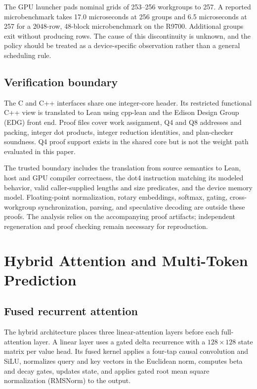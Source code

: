 \documentclass[10pt]{article}
\begin{document}
The GPU launcher pads nominal grids of 253--256 workgroups to 257. A reported microbenchmark takes 17.0 microseconds at 256 groups and 6.5 microseconds at 257 for a 2048-row, 48-block microbenchmark on the R9700. Additional groups exit without producing rows. The cause of this discontinuity is unknown, and the policy should be treated as a device-specific observation rather than a general scheduling rule.

\subsection{Verification boundary}
The C and C++ interfaces share one integer-core header. Its restricted functional C++ view is translated to Lean using cpp-lean and the Edison Design Group (EDG) front end. Proof files cover work assignment, Q4 and Q8 addresses and packing, integer dot products, integer reduction identities, and plan-checker soundness. Q4 proof support exists in the shared core but is not the weight path evaluated in this paper.

The trusted boundary includes the translation from source semantics to Lean, host and GPU compiler correctness, the dot4 instruction matching its modeled behavior, valid caller-supplied lengths and size predicates, and the device memory model. Floating-point normalization, rotary embeddings, softmax, gating, cross-workgroup synchronization, parsing, and speculative decoding are outside these proofs. The analysis relies on the accompanying proof artifacts; independent regeneration and proof checking remain necessary for reproduction.

\section{Hybrid Attention and Multi-Token Prediction}
\subsection{Fused recurrent attention}
The hybrid architecture places three linear-attention layers before each full-attention layer. A linear layer uses a gated delta recurrence with a $128\times128$ state matrix per value head. Its fused kernel applies a four-tap causal convolution and SiLU, normalizes query and key vectors in the Euclidean norm, computes beta and decay gates, updates state, and applies gated root mean square normalization (RMSNorm) to the output.
\end{document}
